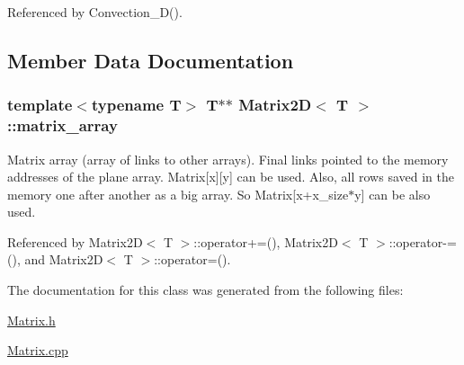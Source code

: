 Referenced by Convection\+\_\+D().



\subsection{Member Data Documentation}
\hypertarget{class_matrix2_d_acb9613c54d199662979a7ab376e4acce}{}
\subsubsection[{matrix\+\_\+array}]{\setlength{\rightskip}{0pt plus 5cm}template$<$typename T$>$ T$\ast$$\ast$ {\bf Matrix2\+D}$<$ T $>$\+::matrix\+\_\+array\hspace{0.3cm}{\ttfamily [private]}}\label{class_matrix2_d_acb9613c54d199662979a7ab376e4acce}
Matrix array (array of links to other arrays). Final links pointed to the memory addresses of the plane array. Matrix\mbox{[}x\mbox{]}\mbox{[}y\mbox{]} can be used. Also, all rows saved in the memory one after another as a big array. So Matrix\mbox{[}x+x\+\_\+size$\ast$y\mbox{]} can be also used. 

Referenced by Matrix2\+D$<$ T $>$\+::operator+=(), Matrix2\+D$<$ T $>$\+::operator-\/=(), and Matrix2\+D$<$ T $>$\+::operator=().



The documentation for this class was generated from the following files\+:\begin{DoxyCompactItemize}
\item 
\hyperlink{_matrix_8h}{Matrix.\+h}\item 
\hyperlink{_matrix_8cpp}{Matrix.\+cpp}\end{DoxyCompactItemize}
